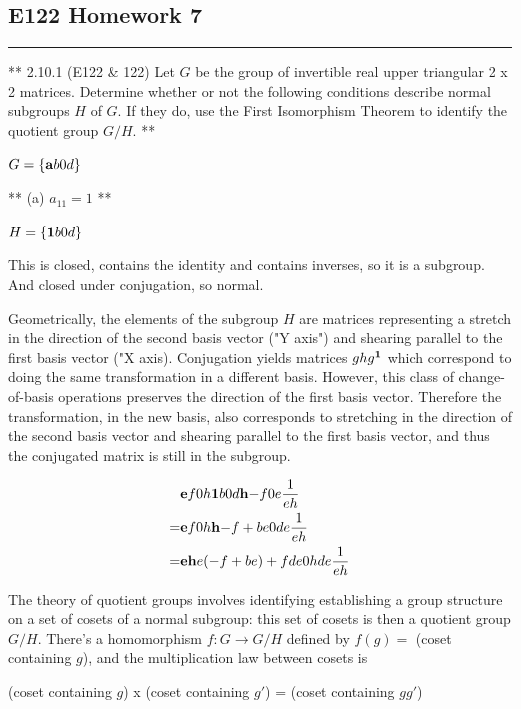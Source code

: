 \subsection{E122 Homework 7}

\hrule


** 2.10.1 (E122 \& 122) Let $G$ be the group of invertible real upper triangular
2 x 2 matrices. Determine whether or not the following conditions describe
normal subgroups $H$ of $G$. If they do, use the First Isomorphism Theorem to
identify the quotient group $G/H$. **

$G = \left\{ \mathbf{a}{b}
                 {0}{d} \right\}$

** (a) $a_{11} = 1$ **

$H = \left\{ \mathbf{1}{b}
                 {0}{d} \right\}$

This is closed, contains the identity and contains inverses, so it is a
subgroup. And closed under conjugation, so normal.

Geometrically, the elements of the subgroup $H$ are matrices representing a
stretch in the direction of the second basis vector ("Y axis") and shearing
parallel to the first basis vector ("X axis). Conjugation yields matrices
$ghg^{\mathbf 1}$ which correspond to doing the same transformation in a different
basis. However, this class of change-of-basis operations preserves the
direction of the first basis vector. Therefore the transformation, in the new
basis, also corresponds to stretching in the direction of the second basis
vector and shearing parallel to the first basis vector, and thus the conjugated
matrix is still in the subgroup.

\begin{align*}
&\mathbf{e}{f}
     {0}{h} \mathbf{1}{b}
                {0}{d} \mathbf{h}{-f}
                           {0}{e} \frac{1}{eh} \\
= &\mathbf{e}{f}
       {0}{h} \mathbf{h}{-f + be}
                  {0}{de     } \frac{1}{eh} \\
= &\mathbf{eh}{e(-f + be) + fde}
       {0}{hde} \frac{1}{eh}
\end{align*}


The theory of quotient groups involves identifying establishing a group
structure on a set of cosets of a normal subgroup: this set of cosets is then a
quotient group $G/H$. There's a homomorphism $f:G \rightarrow G/H$ defined by
$f(g) =$ (coset containing $g$), and the multiplication law between cosets is

(coset containing $g$) x (coset containing $g'$) = (coset containing $gg'$)

